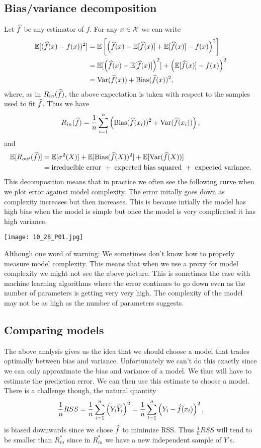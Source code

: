  \subsection{Bias/variance decomposition}
 Let $\widehat{f}$ be any estimator of $f$. For any $x \in {\mathcal{X}}$ we can write
 \begin{align*}
     {\mathbb{E}}[(\widehat{f}(x)-f(x))^2] &= {\mathbb{E}}\left[\left(\widehat{f}(x)-{\mathbb{E}}[\widehat{f}(x)]+{\mathbb{E}}[\widehat{f}(x)]-f(x)\right)^2\right]\\
     &= {\mathbb{E}}[\left(\widehat{f}(x)-{\mathbb{E}}[\widehat{f}(x)]\right)^2]+\left({\mathbb{E}}[\widehat{f}(x)]-f(x)\right)^2\\
     &= \operatorname{Var}(\widehat{f}(x))+\operatorname*{Bias}(\widehat{f}(x))^2,
 \end{align*}
where, as in $R_{in}(\widehat{f})$, the above expectation is taken with respect to the samples used to fit $\widehat{f}$. Thus we have
\[R_{in}(\widehat{f})= \frac{1}{n}\sum_{i=1}^n \left(\operatorname*{Bias}(\widehat{f}(x_i))^2+\operatorname{Var}(\widehat{f}(x_i))\right),\]
and 
\begin{align*}
    {\mathbb{E}}[R_{out}(\widehat{f})]&= {\mathbb{E}}[\sigma^2(X)]+{\mathbb{E}}[\operatorname*{Bias}(\widehat{f}(X))^2]+{\mathbb{E}}[\operatorname{Var}(\widehat{f}(X))]\\
    &= \text{irreducible error }+\text{ expected bias squared }+\text{ expected variance}. 
\end{align*}
This decomposition means that in practice we often see the following curve when we plot error against model complexity. The error initally goes down as complexity increases but then increases. This is because intially the model has high bias when the model is simple but once the model is very complicated it has high variance.

\begin{center}
    \texttt{[image: 10\_28\_P01.jpg]}
\end{center}

Although one word of warning: We sometimes don't know how to properly measure model complexity. This means that when we use a proxy for model complexity we might not see the above picture. This is sometimes the case with machine learning algorithms where the error continues to go down even as the number of parameters is getting very very high. The complexity of the model may not be as high as the number of parameters suggests.

\subsection{Comparing models}
The above analysis gives us the idea that we should choose a model that trades optimally between bias and variance. Unfortunately we can't do this exactly since we can only approximate the bias and variance of a model. We thus will have to estimate the prediction error. We can then use this estimate to choose a model. There is a challenge though, the natural quantity
\[\frac{1}{n}RSS = \frac{1}{n}\sum_{i=1}^n \left(Y_i  \widehat{Y}_i\right)^2 = \frac{1}{n}\sum_{i=1}^n \left(Y_i-\widehat{f}(x_i)\right)^2, \]
is biased downwards since we chose $\widehat{f}$ to minimize RSS. Thus $\frac{1}{n}RSS$ will tend to  be smaller than $R_{in}^*$ since in $R_{in}^*$ we have a new independent sample of $Y$'s.

